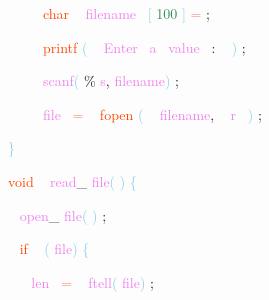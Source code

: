 \documentclass[8, usernames, dvipsnames]{beamer}
\begin{document}
\begin{frame}
\textcolor{White}{\ }
\textcolor{White}{\ }
\textcolor{White}{\ }
\textcolor{OrangeRed}{char}
\textcolor{White}{\ }
\textcolor{Violet}{filename}\textcolor{White}{\ }
\textcolor{SkyBlue}{[}
\textcolor{SeaGreen}{100}
\textcolor{SkyBlue}{]}
\textcolor{Salmon}{=}
\textcolor{Sepia}{;}

 \textcolor{White}{\ }
\textcolor{White}{\ }
\textcolor{White}{\ }
\textcolor{OrangeRed}{printf}
\textcolor{SkyBlue}{(}
\textcolor{White}{\ }
\textcolor{Violet}{Enter}\textcolor{White}{\ }
\textcolor{Violet}{a}\textcolor{White}{\ }
\textcolor{Violet}{value}\textcolor{White}{\ }
\textcolor{Sepia}{:}
\textcolor{White}{\ }
\textcolor{SkyBlue}{)}
\textcolor{Sepia}{;}

 \textcolor{White}{\ }
\textcolor{White}{\ }
\textcolor{White}{\ }
\textcolor{Violet}{scanf}\textcolor{SkyBlue}{(}
\textcolor{Apricot}{\%}
\textcolor{Violet}{s}\textcolor{Sepia}{,}
\textcolor{Violet}{filename}\textcolor{SkyBlue}{)}
\textcolor{Sepia}{;}

 \textcolor{White}{\ }
\textcolor{White}{\ }
\textcolor{White}{\ }
\textcolor{Violet}{file}\textcolor{White}{\ }
\textcolor{Salmon}{=}
\textcolor{White}{\ }
\textcolor{OrangeRed}{fopen}
\textcolor{SkyBlue}{(}
\textcolor{White}{\ }
\textcolor{Violet}{filename}\textcolor{Sepia}{,}
\textcolor{White}{\ }
\textcolor{Violet}{r}\textcolor{White}{\ }
\textcolor{SkyBlue}{)}
\textcolor{Sepia}{;}

 \textcolor{SkyBlue}{\} }

 
 \textcolor{OrangeRed}{void}
\textcolor{White}{\ }
\textcolor{Violet}{read}\textcolor{Sepia}{\_}
\textcolor{Violet}{file}\textcolor{SkyBlue}{(}
\textcolor{SkyBlue}{)}
\textcolor{SkyBlue}{\{ }

 \textcolor{White}{\   }
\textcolor{Violet}{open}\textcolor{Sepia}{\_}
\textcolor{Violet}{file}\textcolor{SkyBlue}{(}
\textcolor{SkyBlue}{)}
\textcolor{Sepia}{;}

 \textcolor{White}{\   }
\textcolor{OrangeRed}{if}
\textcolor{White}{\ }
\textcolor{SkyBlue}{(}
\textcolor{Violet}{file}\textcolor{SkyBlue}{)}
\textcolor{SkyBlue}{\{ }

 \textcolor{White}{\   }
\textcolor{White}{\   }
\textcolor{Violet}{len}\textcolor{White}{\ }
\textcolor{Salmon}{=}
\textcolor{White}{\ }
\textcolor{Violet}{ftell}\textcolor{SkyBlue}{(}
\textcolor{Violet}{file}\textcolor{SkyBlue}{)}
\textcolor{Sepia}{;}

 \end{frame}
\end{document}
